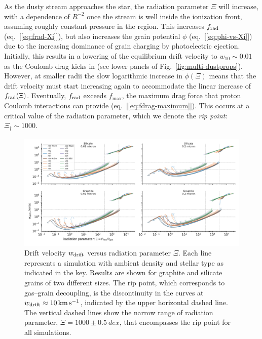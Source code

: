 As the dusty stream approaches the star, the radiation parameter
\(\Xi\) will increase, with a dependence of \(R^{-2}\) once the stream
is well inside the ionization front, assuming roughly constant
pressure in the \hii{} region.  This increases \(f_{\text{rad}}\)
(eq.~[\ref{eq:frad-Xi}]), but also increases the grain potential
\(\phi\) (eq.~[\ref{eq:phi-vs-Xi}]) due to the increasing dominance of
grain charging by photoelectric ejection.  Initially, this results in
a lowering of the equilibrium drift velocity to \(w_{10} \sim 0.01\) as
the Coulomb drag kicks in (see lower panels of
Fig.~\ref{fig:multi-dustprops}).  However, at smaller radii the slow
logarithmic increase in \(\phi(\Xi)\) means that the drift velocity must
start increasing again to accommodate the linear increase of
\(f_{\text{rad}}(\Xi)\).  Eventually, \(f_{\text{rad}}\) exceeds \(f_{\mathrm{max}}\), the
maximum drag force that proton Coulomb interactions can provide
(eq.~[\ref{eq:fdrag-maximum}]).  This occurs at a critical value of
the radiation parameter, which we denote the \textit{rip point}:
\(\Xi_\dag \sim 1000\).

\begin{figure}
  \includegraphics[width=\linewidth]{figs/drift-pratio-4panel}
  \caption{Drift velocity \(w_{\text{drift}}\) versus radiation parameter
    \(\Xi\). Each line represents a simulation with ambient density and
    stellar type as indicated in the key.  Results are shown for
    graphite and silicate grains of two different sizes.  The rip
    point, which corresponds to gas--grain decoupling, is the
    discontinuity in the curves at
    \(w_{\text{drift}} \approx \SI{10}{km.s^{-1}}\), indicated by the upper
    horizontal dashed line.  The vertical dashed lines show the narrow
    range of radiation parameter, \(\Xi = 1000 \pm \SI{0.5}{dex}\), that
    encompasses the rip point for all simulations. }
  \label{fig:drift-gn}
\end{figure}

